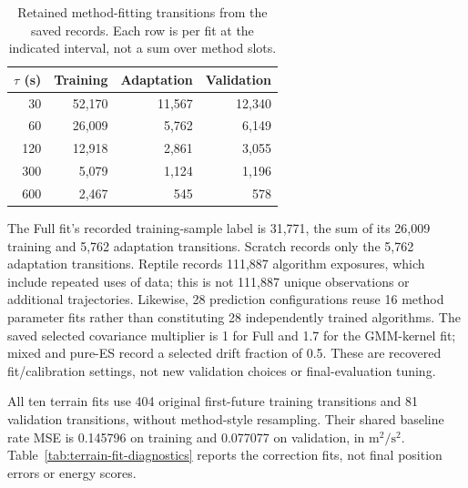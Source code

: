 \begin{table}[htbp]
\centering\small
\caption{Retained method-fitting transitions from the saved records.
Each row is per fit at the indicated interval, not a sum over method slots.}
\label{tab:fit-transition-counts}\hypertarget{tab:fit-transition-counts}{}
\begin{tabular}{rrrr}
\toprule
\(\tau\) (s) & Training & Adaptation & Validation\\
\midrule
30 & 52,170 & 11,567 & 12,340\\
60 & 26,009 & 5,762 & 6,149\\
120 & 12,918 & 2,861 & 3,055\\
300 & 5,079 & 1,124 & 1,196\\
600 & 2,467 & 545 & 578\\
\bottomrule
\end{tabular}
\end{table}

The Full fit's recorded training-sample label is 31,771, the sum of its
26,009 training and 5,762 adaptation transitions. Scratch records only the
5,762 adaptation transitions. Reptile records 111,887 algorithm exposures,
which include repeated uses of data; this is not 111,887 unique observations
or additional trajectories. Likewise, 28 prediction configurations reuse
16 method parameter fits rather than constituting 28 independently trained
algorithms. The saved selected covariance multiplier is 1 for Full and 1.7
for the GMM-kernel fit; mixed and pure-ES record a selected drift fraction
of 0.5. These are recovered fit/calibration settings, not new validation
choices or final-evaluation tuning.

All ten terrain fits use 404 original first-future training transitions and
81 validation transitions, without method-style resampling. Their shared
baseline rate MSE is 0.145796 on training and 0.077077 on validation, in
\(\mathrm{m}^2/\mathrm{s}^2\). Table~\ref{tab:terrain-fit-diagnostics}
reports the correction fits, not final position errors or energy scores.

